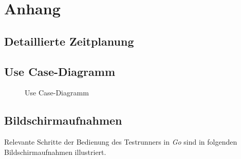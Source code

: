  \section{Anhang}
 \subsection{Detaillierte Zeitplanung}
 \label{app:Zeitplanung}



\clearpage
 \subsection{Use Case-Diagramm}\label{usecasediagram}

 \begin{figure}[htb]
 \centering
 \caption{Use Case-Diagramm}
  \label{app:UseCase}

 \end{figure}

% 

 \clearpage

 
 \clearpage

 \subsection{Bildschirmaufnahmen}\label{screenshots}
 Relevante Schritte der Bedienung des Testrunners in \emph{Go} sind in folgenden Bildschirmaufnahmen illustriert.


